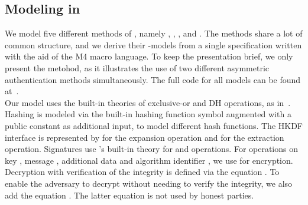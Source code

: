 \subsection{Modeling \mEdhoc{} in \mTamarin}
\label{sec:modeling}
%
We model five different methods of \mEdhoc{}, namely \mPskPsk,
\mSigSig, \mSigStat, \mStatSig{} and \mStatStat.
%
The methods share a lot of common structure, and we derive
their \mTamarin-models from a single specification written with the aid of the
M4 macro language.
%
%
To keep the presentation brief, we only present the \mStatSig{} metohod, as it
illustrates the use of two different asymmetric authentication methods
simultaneously.
%
The full \mTamarin{} code for all models can be found at~\cite{edhocTamarinRepo}.
\\
%

Our model uses the built-in theories of exclusive-or and DH operations, as
in~\cite{DBLP:conf/csfw/DreierHRS18,DBLP:conf/csfw/SchmidtMCB12}.
%
Hashing is modeled via the built-in hashing function symbol augmented
with a public constant as additional input, to model different
hash functions.
%
%
The HKDF interface is represented by  for the
expansion operation and  for the extraction operation.
%
Signatures use \mTamarin's built-in theory for  and 
operations.
%
%
%
For \mAead{} operations on key , message \mbox{}, additional data 
and algorithm identifier , we use 
for encryption.
%
Decryption with verification of the integrity is defined via the equation
.
%
To enable the adversary to decrypt without needing to verify the integrity, we
also add the equation .
%
The latter equation is not used by honest parties.\\
%

